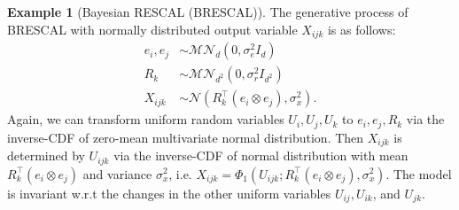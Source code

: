 \documentclass{article}
\theoremstyle{definition}
\newtheorem{example}{Example}[definition]
\begin{document}
\begin{example}[Bayesian RESCAL (BRESCAL)] The generative process of BRESCAL with normally distributed output variable $X_{ijk}$ is as follows:
\begin{align}
e_i, e_j &\sim \mathcal{MN}_d(0, \sigma_e^2 I_d)\\
R_k &\sim \mathcal{MN}_{d^2}(0, \sigma_r^2 I_{d^2})\\
X_{ijk} &\sim \mathcal{N}(R_k^\top (e_i \otimes e_j), \sigma_x^2).
\end{align}
Again, we can transform uniform random variables $U_i, U_j, U_k$ to $e_i, e_j, R_k$ via the inverse-CDF of zero-mean multivariate normal distribution. Then $X_{ijk}$ is determined by $U_{ijk}$ via the inverse-CDF of normal distribution with mean $R_k^\top (e_i \otimes e_j)$ and variance $\sigma_x^2$, i.e. $X_{ijk} = \Phi_1(U_{ijk};R_k^\top (e_i \otimes e_j), \sigma_x^2)$. The model is invariant w.r.t the changes in the other uniform variables $U_{ij}, U_{ik}$, and $U_{jk}$.
\end{example}
\end{document}

